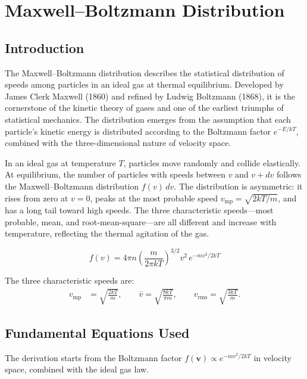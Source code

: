\chapter{Maxwell--Boltzmann Distribution}

\section*{Introduction}

The Maxwell--Boltzmann distribution describes the statistical distribution of speeds among particles in an ideal gas at thermal equilibrium. Developed by James Clerk Maxwell (1860) and refined by Ludwig Boltzmann (1868), it is the cornerstone of the kinetic theory of gases and one of the earliest triumphs of statistical mechanics. The distribution emerges from the assumption that each particle's kinetic energy is distributed according to the Boltzmann factor $e^{-E/kT}$, combined with the three-dimensional nature of velocity space.

In an ideal gas at temperature $T$, particles move randomly and collide elastically. At equilibrium, the number of particles with speeds between $v$ and $v + dv$ follows the Maxwell--Boltzmann distribution $f(v)\,dv$. The distribution is asymmetric: it rises from zero at $v = 0$, peaks at the most probable speed $v_{\text{mp}} = \sqrt{2kT/m}$, and has a long tail toward high speeds. The three characteristic speeds---most probable, mean, and root-mean-square---are all different and increase with temperature, reflecting the thermal agitation of the gas.


\begin{equation}
\boxed{\; f(v) = 4\pi n \left(\frac{m}{2\pi kT}\right)^{3/2} v^{2}\,e^{-mv^{2}/2kT}\;}
\label{eq:maxwell-boltzmann}
\end{equation}

The three characteristic speeds are:
\begin{align}
v_{\text{mp}} &= \sqrt{\frac{2kT}{m}}, \qquad \bar{v} = \sqrt{\frac{8kT}{\pi m}}, \qquad v_{\text{rms}} = \sqrt{\frac{3kT}{m}}.
\label{eq:mb-speeds}
\end{align}

\section*{Fundamental Equations Used}

The derivation starts from the Boltzmann factor $f(\mathbf{v}) \propto e^{-mv^2/2kT}$ in velocity space, combined with the ideal gas law.

